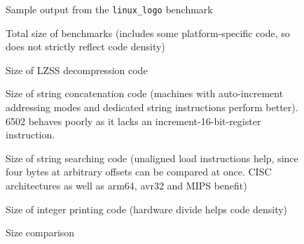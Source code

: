 \documentclass{article}[10pt]
\begin{document}
\begin{figure}[tbp]
  \centering
  \caption{Sample output from the {\tt linux\_logo} benchmark}
  \label{figure:ll}
\end{figure}

%
%

\noindent




\begin{figure}[tbp]
  \centering
  \caption{Total size of benchmarks 
           (includes some platform-specific code, so does not
           strictly reflect code density)}
  \label{figure:total}
\end{figure}

\begin{figure}[tbp]
  \centering
  \caption{Size of LZSS decompression code}
  \label{figure:decomp}
\end{figure}

\begin{figure}[tbp]
  \centering
  \caption{Size of string concatenation code (machines with 
           auto-increment addressing modes and dedicated
           string instructions perform better). 6502 behaves poorly as it
           lacks an increment-16-bit-register instruction.}
  \label{figure:strcat}
\end{figure}

\begin{figure}[tbp]
  \centering
  \caption{Size of string searching code (unaligned load
           instructions help, since four bytes at arbitrary offsets 
           can be compared at once.  
           CISC architectures as well as arm64, avr32 and MIPS benefit)}
  \label{figure:findstring}
\end{figure}

\begin{figure}[tbp]
  \centering
  \caption{Size of integer printing code (hardware
           divide helps code density)}
  \label{figure:numascii}
\end{figure}

\begin{figure}[tbp]
  \centering
  \caption{Size comparison}
  \label{figure:libc}
\end{figure}

\pagebreak

{


}
\end{document}
